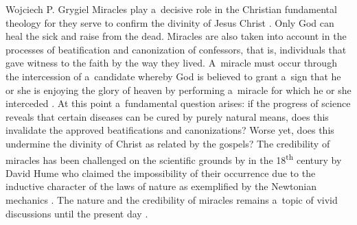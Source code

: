 \begin{artengenv}{Wojciech P. Grygiel}
Miracles play a~decisive role in the Christian fundamental theology for they serve to confirm the divinity of Jesus Christ
\parencite[][pp.330–359]{rusecki_traktat_2006}. %
 Only God can heal the sick and raise from the dead. Miracles are also taken into account in the processes of beatification and canonization of confessors, that is, individuals that gave witness to the faith by the way they lived. A~miracle must occur through the intercession of a~candidate whereby God is believed to grant a~sign that he or she is enjoying the glory of heaven by performing a~miracle for which he or she interceded 
\parencite[][]{john_paul_ii_apostolic_1983}. %
 At this point a~fundamental question arises: if the progress of science reveals that certain diseases can be cured by purely natural means, does this invalidate the approved beatifications and canonizations? Worse yet, does this undermine the divinity of Christ as related by the gospels? The credibility of miracles has been challenged on the scientific grounds by in the 18\textsuperscript{th} century by David Hume who claimed the impossibility of their occurrence due to the inductive character of the laws of nature as exemplified by the Newtonian mechanics 
\parencite[][pp.79–95]{hume_enquiry_2008}.%
 The nature and the credibility of miracles remains a~topic of vivid discussions until the present day 
\parencite[e.g.][]{mcgrew_miracles_2019}.%



\end{artengenv}
